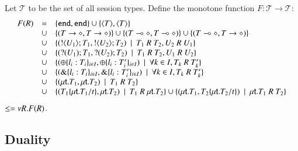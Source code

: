 \begin{definition}
Let $\mathcal{T}$ to be the set of all session types.
Define the monotone function $F: \mathcal{T} \longrightarrow \mathcal{T}$:
%
\[
	\begin{array}{rcl}
		F(R)	& = &	\{\mathtt{end}, \mathtt{end}\}
			\cup	\{\langle T \rangle, \langle T \rangle\}\\
			&\cup&	\{(T \rightarrow \diamond, T \rightarrow \diamond)\}
			\cup	\{(T \multimap \diamond, T \multimap \diamond)\}
			\cup	\{(T \multimap \diamond, T \rightarrow \diamond)\}\\
			&\cup&	\{(! \langle U_1 \rangle ; T_1, ! \langle U_2 \rangle ; T_2) \ \ |\ \  T_1\ R\ T_2, U_2\ R\ U_1\}\\
			&\cup&	\{(? (U_1) ; T_1, ? (U_2) ; T_2) \ \ |\ \  T_1\ R\ T_2, U_1\ R\ U_2\}\\
			&\cup&	\{(\oplus \{l_i: T_i\}_{i \in I}, \oplus \{l_i: T'_i\}_{i \in I}) \ \ |\ \  \forall k \in I, T_k\ R\ T'_k\}\\
			&\cup&	\{(\& \{l_i: T_i\}_{i \in I}, \& \{l_i: T'_i\}_{i \in I}) \ \ |\ \  \forall k \in I, T_k\ R\ T'_k\}\\
			&\cup&	\{(\mu\mathsf{t}.T_1, \mu\mathsf{t}.T_2) \ \ |\ \  T_1\ R\ T_2\}\\
			&\cup&	\{(T_1\{\mu\mathsf{t}.T_1/t \}, \mu\mathsf{t}.T_2) \ \ |\ \  T_1\ R\ \mu\mathsf{t}.T_2\}
			\cup	\{(\mu\mathsf{t}.T_1, T_2\{\mu\mathsf{t}.T_2/t \}) \ \ |\ \  \mu\mathsf{t}.T_1\ R\ T_2\}\\
	\end{array}
\]
%
$\leq = \nu R.F(R)$.
\end{definition}

\subsection{Duality}

